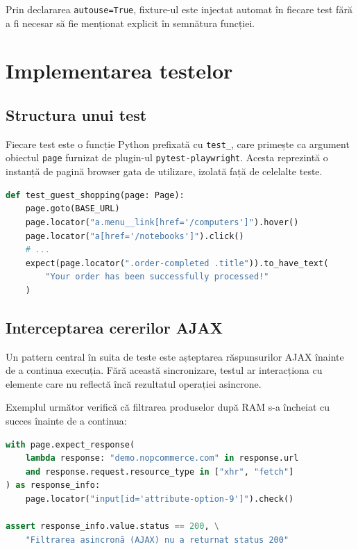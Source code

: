 Prin declararea \texttt{autouse=True}, fixture-ul este injectat automat în fiecare test
fără a fi necesar să fie menționat explicit în semnătura funcției.

\section{Implementarea testelor}

\subsection{Structura unui test}

Fiecare test este o funcție Python prefixată cu \texttt{test\_}, care primește ca argument
obiectul \texttt{page} furnizat de plugin-ul \texttt{pytest-playwright}. Acesta reprezintă
o instanță de pagină browser gata de utilizare, izolată față de celelalte teste.

\begin{lstlisting}[language=Python, caption={Structura de bază a unui test Playwright}]
def test_guest_shopping(page: Page):
    page.goto(BASE_URL)
    page.locator("a.menu__link[href='/computers']").hover()
    page.locator("a[href='/notebooks']").click()
    # ...
    expect(page.locator(".order-completed .title")).to_have_text(
        "Your order has been successfully processed!"
    )
\end{lstlisting}

\subsection{Interceptarea cererilor AJAX}

Un pattern central în suita de teste este așteptarea răspunsurilor AJAX înainte de a
continua execuția. Fără această sincronizare, testul ar interacționa cu elemente care
nu reflectă încă rezultatul operației asincrone.

Exemplul următor verifică că filtrarea produselor după RAM s-a încheiat cu succes înainte
de a continua:

\begin{lstlisting}[language=Python, caption={Interceptare răspuns AJAX la aplicarea filtrului}]
with page.expect_response(
    lambda response: "demo.nopcommerce.com" in response.url
    and response.request.resource_type in ["xhr", "fetch"]
) as response_info:
    page.locator("input[id='attribute-option-9']").check()

assert response_info.value.status == 200, \
    "Filtrarea asincronă (AJAX) nu a returnat status 200"
\end{lstlisting}

